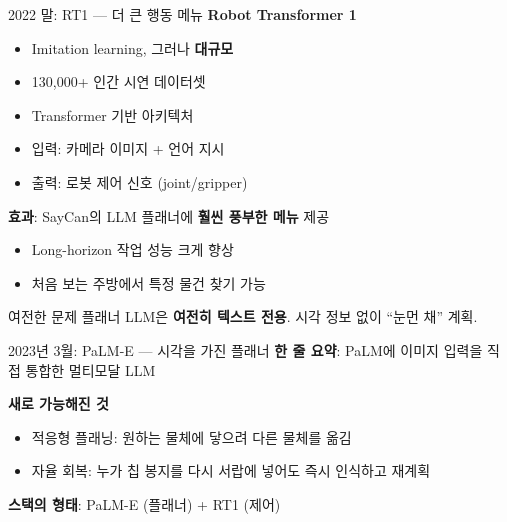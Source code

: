 \documentclass[aspectratio=169,10pt]{beamer}
\begin{document}
\begin{frame}{2022 말: RT1 --- 더 큰 행동 메뉴}
\textbf{Robot Transformer 1}
\begin{itemize}
  \item Imitation learning, 그러나 \textbf{대규모}
  \item \alert{130{,}000+ 인간 시연} 데이터셋
  \item Transformer 기반 아키텍처
  \item 입력: 카메라 이미지 + 언어 지시
  \item 출력: 로봇 제어 신호 (joint/gripper)
\end{itemize}

\vspace{0.4em}
\textbf{효과}: SayCan의 LLM 플래너에 \textbf{훨씬 풍부한 메뉴} 제공
\begin{itemize}
  \item Long-horizon 작업 성능 크게 향상
  \item 처음 보는 주방에서 특정 물건 찾기 가능
\end{itemize}

\vspace{0.4em}
\begin{alertblock}{여전한 문제}
플래너 LLM은 \textbf{여전히 텍스트 전용}. 시각 정보 없이 ``눈먼 채'' 계획.
\end{alertblock}
\end{frame}

\begin{frame}{2023년 3월: PaLM-E --- 시각을 가진 플래너}
\textbf{한 줄 요약}: PaLM에 이미지 입력을 직접 통합한 멀티모달 LLM

\vspace{0.6em}
\textbf{새로 가능해진 것}
\begin{itemize}
  \item 적응형 플래닝: 원하는 물체에 닿으려 다른 물체를 옮김
  \item 자율 회복: 누가 칩 봉지를 다시 서랍에 넣어도 즉시 인식하고 재계획
\end{itemize}

\vspace{0.8em}
\textbf{스택의 형태}: PaLM-E (플래너) + RT1 (제어)

\vspace{0.5em}
\begin{center}
\end{center}
\end{frame}
\end{document}
